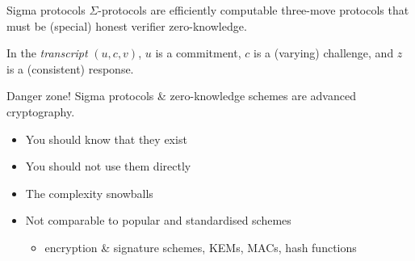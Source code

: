\begin{frame}{Sigma protocols}
  \pause
  $\Sigma$-protocols are efficiently computable three-move protocols that must be (special) honest verifier zero-knowledge.

  \pause
  \begin{figure}
    \centering
  \end{figure}

  \pause
  In the \emph{transcript} $(u, c, v)$, $u$ is a commitment, $c$ is a (varying) challenge, and $z$ is a (consistent) response.
\end{frame}

\begin{frame}{Danger zone!}
  Sigma protocols \& zero-knowledge schemes are advanced cryptography.
  \begin{itemize}[<+(1)->]
    \item You should know that they exist
    \item You should not use them directly
    \item The complexity snowballs
    \item Not comparable to popular and standardised schemes
    \begin{itemize}
      \item encryption \& signature schemes, KEMs, MACs, hash functions
    \end{itemize}
  \end{itemize}
\end{frame}

